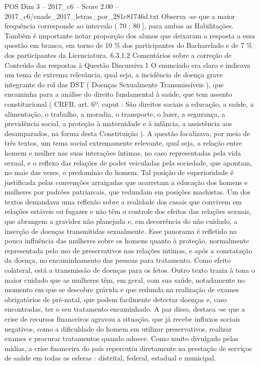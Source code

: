 \begin{textsample}{POS Dim 3 – 2017\_c6 – Score 2.00 – 2017\_c6/enade\_2017\_letras\_por\_281c81746d.txt}
Observa -se que a maior frequência corresponde ao intervalo ( 70 ; 80 ], para ambas as Habilitações.
Também é importante notar proporção dos alunos que deixaram a resposta a essa questão em branco, em torno de 10 \% dos participantes do Bacharelado e de 7 \% dos participantes da Licenciatura. 6.3.1.2 Comentários sobre a correção de Conteúdo das respostas à Questão Discursiva 1 O enunciado era claro e indicava um tema de extrema relevância, qual seja, a incidência de doença grave integrante do rol das DST ( Doenças Sexualmente Transmissíveis ), que encaminha para a análise do direito fundamental à saúde, que tem assento constitucional ( CRFB, art. 6º. caput : São direitos sociais a educação, a saúde, a alimentação, o trabalho, a moradia, o transporte, o lazer, a segurança, a previdência social, a proteção à maternidade e à infância, a assistência aos desamparados, na forma desta Constituição ).
A questão focalizava, por meio de três textos, um tema social extremamente relevante, qual seja, a relação entre homem e mulher nas suas interações íntimas, no caso representadas pela vida sexual, e o reflexo das relações de poder veiculadas pela sociedade, que apontam, no mais das vezes, o predomínio do homem.
Tal posição de superioridade é justificada pelas convenções arraigadas que acarretam a educação dos homens e mulheres por padrões patriarcais, que redundam em posições machistas.
Um dos textos demandava uma reflexão sobre a realidade dos casais que convivem em relações estáveis ou fugazes e não têm o controle dos efeitos das relações sexuais, que abrangem a gravidez não planejada e, em decorrência do não cuidado, a inserção de doenças transmitidas sexualmente.
Esse panorama é refletido na pouca influência das mulheres sobre os homens quanto à proteção, normalmente representada pelo uso de preservativos nas relações intimas, e após a constatação da doença, no encaminhamento das pessoas para tratamento.
Como efeito colateral, está a transmissão de doenças para os fetos.
Outro texto trazia à tona o maior cuidado que as mulheres têm, em geral, com sua saúde, notadamente no momento em que se descobre grávida e que redunda na realização de exames obrigatórios de pré-natal, que podem facilmente detectar doenças e, caso encontradas, ter o seu tratamento encaminhado.
A par disso, destaca -se que a crise de recursos financeiros agravou a situação, que já recebe influxos sociais negativos, como a dificuldade do homem em utilizar preservativos, realizar exames e procurar tratamentos quando adoece.
Como muito divulgado pelas mídias, a crise financeira do país repercutiu diretamente na prestação de serviços de saúde em todas as esferas : distrital, federal, estadual e municipal.

\end{textsample}
